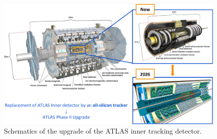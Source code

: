 \begin{landscape}
\begin{figure}[h!]
	\centering
	\includegraphics[height=0.9\textwidth]{img/ATLAS.pdf}
	\caption{Schematics of the upgrade of the ATLAS inner tracking detector.}
	\label{fig:ATLAS}
\end{figure}
\end{landscape}